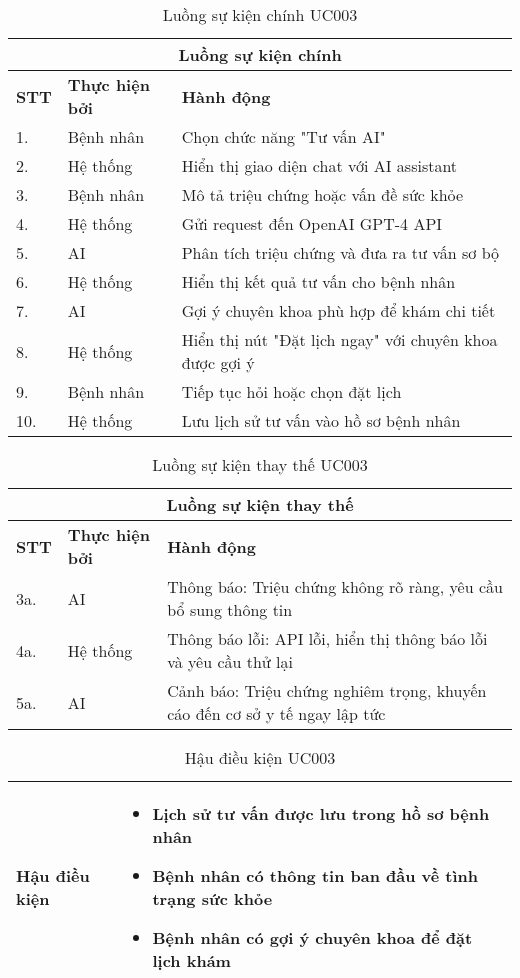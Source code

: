 \documentclass[../DoAn.tex]{subfiles}
\begin{document}
\begin{table}[H]
\centering
\begin{tabular}{|p{1cm}|p{3cm}|p{9cm}|}
\hline
\multicolumn{3}{|c|}{\textbf{Luồng sự kiện chính}} \\
\hline
\textbf{STT} & \textbf{Thực hiện bởi} & \textbf{Hành động} \\
\hline
1. & Bệnh nhân & Chọn chức năng "Tư vấn AI" \\
\hline
2. & Hệ thống & Hiển thị giao diện chat với AI assistant \\
\hline
3. & Bệnh nhân & Mô tả triệu chứng hoặc vấn đề sức khỏe \\
\hline
4. & Hệ thống & Gửi request đến OpenAI GPT-4 API \\
\hline
5. & AI & Phân tích triệu chứng và đưa ra tư vấn sơ bộ \\
\hline
6. & Hệ thống & Hiển thị kết quả tư vấn cho bệnh nhân \\
\hline
7. & AI & Gợi ý chuyên khoa phù hợp để khám chi tiết \\
\hline
8. & Hệ thống & Hiển thị nút "Đặt lịch ngay" với chuyên khoa được gợi ý \\
\hline
9. & Bệnh nhân & Tiếp tục hỏi hoặc chọn đặt lịch \\
\hline
10. & Hệ thống & Lưu lịch sử tư vấn vào hồ sơ bệnh nhân \\
\hline
\end{tabular}
\caption{Luồng sự kiện chính UC003}
\end{table}

\begin{table}[H]
\centering
\begin{tabular}{|p{1cm}|p{3cm}|p{9cm}|}
\hline
\multicolumn{3}{|c|}{\textbf{Luồng sự kiện thay thế}} \\
\hline
\textbf{STT} & \textbf{Thực hiện bởi} & \textbf{Hành động} \\
\hline
3a. & AI & Thông báo: Triệu chứng không rõ ràng, yêu cầu bổ sung thông tin \\
\hline
4a. & Hệ thống & Thông báo lỗi: API lỗi, hiển thị thông báo lỗi và yêu cầu thử lại \\
\hline
5a. & AI & Cảnh báo: Triệu chứng nghiêm trọng, khuyến cáo đến cơ sở y tế ngay lập tức \\
\hline
\end{tabular}
\caption{Luồng sự kiện thay thế UC003}
\end{table}

\begin{table}[H]
\centering
\begin{tabular}{|p{3cm}|p{10cm}|}
\hline
\textbf{Hậu điều kiện} & 
\begin{itemize}
    \item Lịch sử tư vấn được lưu trong hồ sơ bệnh nhân
    \item Bệnh nhân có thông tin ban đầu về tình trạng sức khỏe
    \item Bệnh nhân có gợi ý chuyên khoa để đặt lịch khám
\end{itemize} \\
\hline
\end{tabular}
\caption{Hậu điều kiện UC003}
\end{table}
\end{document}
